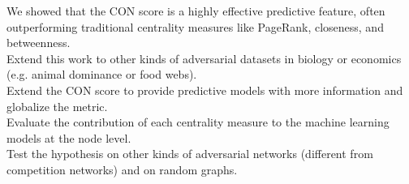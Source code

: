 \documentclass[preview]{standalone}
\begin{document}
We showed that the CON score is a highly effective predictive feature, often outperforming traditional centrality measures like PageRank, closeness, and betweenness.\\Extend this work to other kinds of adversarial datasets in biology or economics (e.g. animal dominance or food webs).\\Extend the CON score to provide predictive models with more information and globalize the metric.\\Evaluate the contribution of each centrality measure to the machine learning models at the node level.\\Test the hypothesis on other kinds of adversarial networks (different from competition networks) and on random graphs.\\
\end{document}
